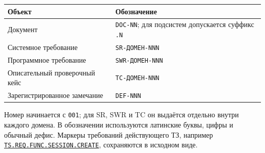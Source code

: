 \documentclass[12pt,a4paper]{article}
\begin{document}
{\def\LTcaptype{none} %
\begin{longtable}[]{@{}
  >{\raggedright\arraybackslash}p{}
  >{\raggedright\arraybackslash}p{}@{}}
\toprule\noalign{}
\begin{minipage}[b]{\linewidth}\raggedright
Объект
\end{minipage} & \begin{minipage}[b]{\linewidth}\raggedright
Обозначение
\end{minipage} \\
\midrule\noalign{}
\endhead
\bottomrule\noalign{}
\endlastfoot
Документ & \texttt{DOC-NN}; для подсистем допускается суффикс \texttt{.N} \\
Системное требование & \texttt{SR-\allowbreak{}ДОМЕН-\allowbreak{}NNN} \\
Программное требование & \texttt{SWR-\allowbreak{}ДОМЕН-\allowbreak{}NNN} \\
Описательный проверочный кейс & \texttt{TC-\allowbreak{}ДОМЕН-\allowbreak{}NNN} \\
Зарегистрированное замечание & \texttt{DEF-NNN} \\
\end{longtable}
}

Номер начинается с \texttt{001}; для SR, SWR и TC он выдаётся отдельно внутри каждого домена. В обозначении используются латинские буквы, цифры и обычный дефис. Маркеры требований действующего ТЗ, например {\href{../../02\_Техническое\_задание/Техническое\_задание.pdf\#ts-req-func-session-create}{\texttt{TS.\allowbreak{}REQ.\allowbreak{}FUNC.\allowbreak{}SESSION.\allowbreak{}CREATE}}}, сохраняются в исходном виде.
\end{document}
